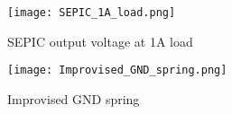 
\begin{figure}[ht]
    \texttt{[image: SEPIC\_1A\_load.png]}
    \caption{SEPIC output voltage at 1A load}
    \label{fig:Verification_SEPIC_1A_Load}
\end{figure}

\begin{figure}[ht]
    \texttt{[image: Improvised\_GND\_spring.png]}
    \caption{Improvised GND spring}
    \label{fig:Improvised_GND_spring}
\end{figure}